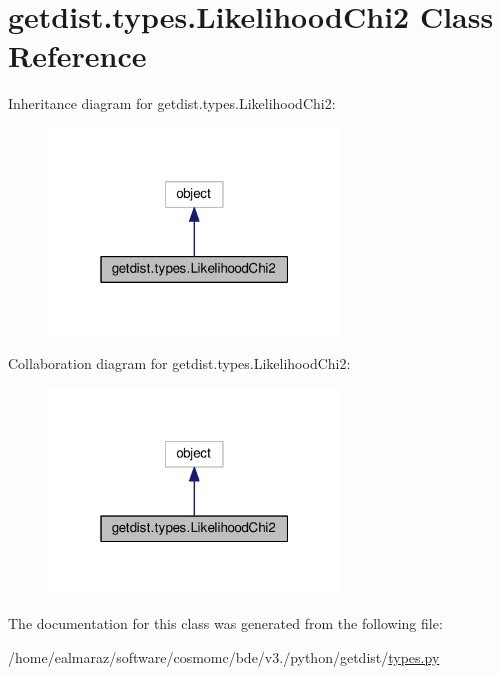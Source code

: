 \hypertarget{classgetdist_1_1types_1_1LikelihoodChi2}{}\section{getdist.\+types.\+Likelihood\+Chi2 Class Reference}
\label{classgetdist_1_1types_1_1LikelihoodChi2}


Inheritance diagram for getdist.\+types.\+Likelihood\+Chi2\+:
\nopagebreak
\begin{figure}[H]
\begin{center}
\leavevmode
\includegraphics[width=220pt]{classgetdist_1_1types_1_1LikelihoodChi2__inherit__graph}
\end{center}
\end{figure}


Collaboration diagram for getdist.\+types.\+Likelihood\+Chi2\+:
\nopagebreak
\begin{figure}[H]
\begin{center}
\leavevmode
\includegraphics[width=220pt]{classgetdist_1_1types_1_1LikelihoodChi2__coll__graph}
\end{center}
\end{figure}


The documentation for this class was generated from the following file\+:\begin{DoxyCompactItemize}
\item 
/home/ealmaraz/software/cosmomc/bde/v3./python/getdist/\mbox{\hyperlink{types_8py}{types.\+py}}\end{DoxyCompactItemize}
